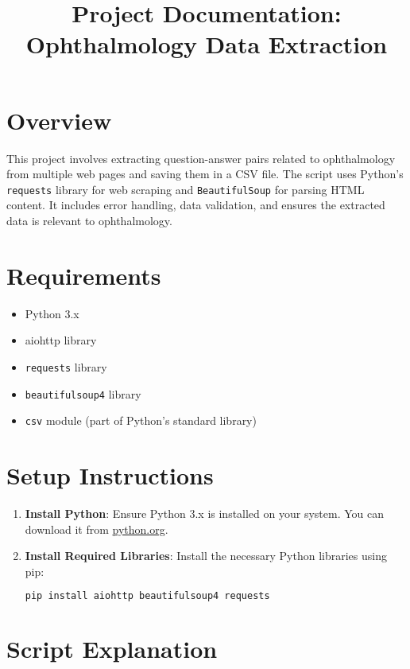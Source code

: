 \documentclass[a4paper,12pt]{article}
\title{Project Documentation: Ophthalmology Data Extraction}
\author{}
\date{}
\begin{document}
\maketitle

\tableofcontents
\newpage

\section{Overview}
This project involves extracting question-answer pairs related to ophthalmology from multiple web pages and saving them in a CSV file. The script uses Python's \texttt{requests} library for web scraping and \texttt{BeautifulSoup} for parsing HTML content. It includes error handling, data validation, and ensures the extracted data is relevant to ophthalmology.

\section{Requirements}
\begin{itemize}
    \item Python 3.x
    \item aiohttp library
    \item \texttt{requests} library
    \item \texttt{beautifulsoup4} library
    \item \texttt{csv} module (part of Python's standard library)
    
\end{itemize}

\section{Setup Instructions}
\begin{enumerate}
    \item \textbf{Install Python}: Ensure Python 3.x is installed on your system. You can download it from \href{https://www.python.org/}{python.org}.
    \item \textbf{Install Required Libraries}: Install the necessary Python libraries using pip:
    \begin{lstlisting}[language=bash]
pip install aiohttp beautifulsoup4 requests
    \end{lstlisting}
\end{enumerate}

\section{Script Explanation}
\end{document}
